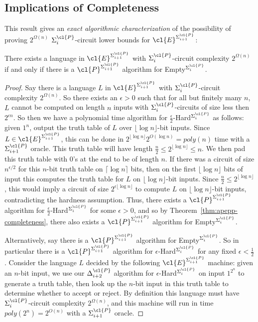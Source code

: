 \subsection{Implications of Completeness}
This result gives an \emph{exact algorithmic characterization} of the possibility of proving $2^{\Omega(n)}$ $\Sigma^\cl{P}_i$-circuit lower bounds for $\cl{E}^{\Sigma^\cl{P}_{i+1}}$:
\begin{theorem}\label{thm:LB-algo-equivalence}
There exists a language in $\cl{E}^{\Sigma^\cl{P}_{i+1}}$ with $\Sigma^\cl{P}_i$-circuit complexity $2^{\Omega(n)}$ if and only if there is a $\cl{P}^{\Sigma_{i+1}^\cl{P}}$ algorithm for {\sc Empty}$^{\Sigma^\cl{P}_i}$.
\end{theorem}
\begin{proof}
Say there is a language $L$ in $\cl{E}^{\Sigma^\cl{P}_{i+1}}$ with $\Sigma^\cl{P}_i$-circuit complexity $2^{\Omega(n)}$. So there exists an $\epsilon > 0$ such that for all but finitely many $n$, $L$ cannot be computed on length $n$ inputs with $\Sigma^\cl{P}_i$-circuits of size less then $2^{\epsilon n}$. So then we have a polynomial time algorithm for {\sc $\frac{\epsilon}{2}$-Hard}$^{\Sigma^\cl{P}_i}$ as follows: given $1^n$, output the truth table of $L$ over $\lfloor \log n \rfloor$-bit inputs. Since $L \in \cl{E}^{\Sigma^\cl{P}_{i+1}}$, this can be done in $2^{\lfloor \log n \rfloor}2^{O(\log n)} = poly(n)$ time with a $\Sigma^\cl{P}_{i+1}$ oracle. This truth table will have length $\frac{n}{2} \leq 2^{\lfloor \log n \rfloor} \leq n$. We then pad this truth table with 0's at the end to be of length $n$. If there was a circuit of size $n^{\epsilon/2}$ for this $n$-bit truth table on $\lceil \log n \rceil$ bits, then on the first $\lfloor \log n \rfloor$ bits of input this computes the truth table for $L$ on $\lfloor \log n \rfloor$-bit inputs. Since $\frac{n}{2} \leq 2^{\lfloor \log n \rfloor}$, this would imply a circuit of size $2^{\epsilon \lfloor \log n \rfloor}$ to compute $L$ on $\lfloor \log n \rfloor$-bit inputs, contradicting the hardness assumption. Thus, there exists a $\cl{P}^{\Sigma_{i+1}^\cl{P}}$ algorithm for {\sc $\frac{\epsilon}{2}$-Hard}$^{\Sigma^\cl{P}_i}$ for some $\epsilon > 0$, and so by Theorem~\ref{thm:apepp-completeness}, there also exists a $\cl{P}^{\Sigma_{i+1}^\cl{P}}$ algorithm for {\sc Empty}$^{\Sigma^\cl{P}_i}$.

Alternatively, say there is a $\cl{P}^{\Sigma_{i+1}^\cl{P}}$ algorithm for {\sc Empty}$^{\Sigma^\cl{P}_i}$. So in particular there is a $\cl{P}^{\Sigma_{i+1}^\cl{P}}$ algorithm for {\sc $\epsilon$-Hard}$^{\Sigma^\cl{P}_i}$ for any fixed $\epsilon < \frac{1}{2}$. Consider the language $L$ decided by the following $\cl{E}^{\Sigma^\cl{P}_{i+1}}$ machine: given an $n$-bit input, we use our $\Delta^\cl{P}_{i+2}$ algorithm for {\sc $\epsilon$-Hard}$^{\Sigma^\cl{P}_i}$ on input $1^{2^n}$ to generate a truth table, then look up the $n$-bit input in this truth table to determine whether to accept or reject. By definition this language must have $\Sigma^\cl{P}_i$-circuit complexity $2^{\Omega(n)}$, and this machine will run in time $poly(2^n) = 2^{O(n)}$ with a $\Sigma^\cl{P}_{i+1}$ oracle.
\end{proof}

